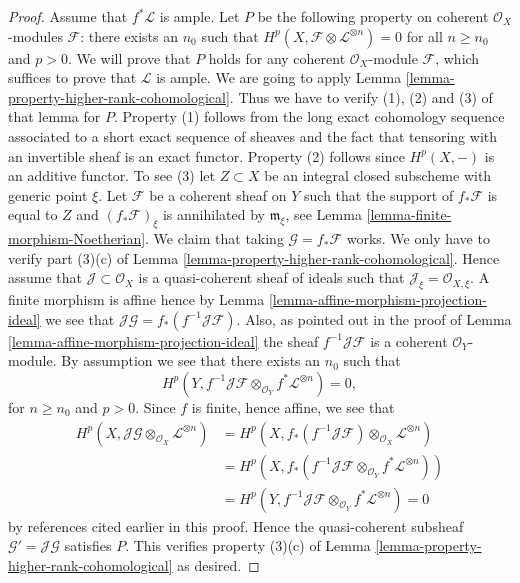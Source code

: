 \begin{proof}
\medskip\noindent
Assume that $f^*\mathcal{L}$ is ample. Let $P$ be the following property on
coherent $\mathcal{O}_X$-modules $\mathcal{F}$: there exists an $n_0$
such that $H^p(X, \mathcal{F} \otimes \mathcal{L}^{\otimes n}) = 0$
for all $n \geq n_0$ and $p > 0$. We will prove that $P$ holds
for any coherent $\mathcal{O}_X$-module $\mathcal{F}$, which suffices
to prove that $\mathcal{L}$ is ample.
We are going to apply Lemma \ref{lemma-property-higher-rank-cohomological}.
Thus we have to verify (1), (2) and (3) of that lemma for $P$.
Property (1) follows from the long exact cohomology sequence associated
to a short exact sequence of sheaves and the fact that tensoring with
an invertible sheaf is an exact functor. Property (2) follows since
$H^p(X, -)$ is an additive functor. To see (3) let $Z \subset X$ be
an integral closed subscheme with generic point $\xi$.
Let $\mathcal{F}$ be a coherent sheaf on $Y$ such that
the support of $f_*\mathcal{F}$ is equal to $Z$
and $(f_*\mathcal{F})_\xi$ is annihilated by $\mathfrak m_\xi$,
see Lemma \ref{lemma-finite-morphism-Noetherian}. We claim that
taking $\mathcal{G} = f_*\mathcal{F}$ works. We only have to verify
part (3)(c) of Lemma \ref{lemma-property-higher-rank-cohomological}.
Hence assume that $\mathcal{J} \subset \mathcal{O}_X$ is a
quasi-coherent sheaf of ideals such that
$\mathcal{J}_\xi = \mathcal{O}_{X, \xi}$.
A finite morphism is affine hence by
Lemma \ref{lemma-affine-morphism-projection-ideal} we see that
$\mathcal{J}\mathcal{G} = f_*(f^{-1}\mathcal{J}\mathcal{F})$.
Also, as pointed out in the proof of
Lemma \ref{lemma-affine-morphism-projection-ideal} the sheaf
$f^{-1}\mathcal{J}\mathcal{F}$ is a coherent $\mathcal{O}_Y$-module.
By assumption we see that there exists an $n_0$ such that
$$
H^p(Y, f^{-1}\mathcal{J}\mathcal{F}
\otimes_{\mathcal{O}_Y} f^*\mathcal{L}^{\otimes n}) = 0,
$$
for $n \geq n_0$ and $p > 0$. Since $f$ is finite, hence affine, we see that
\begin{align*}
H^p(X, \mathcal{J}\mathcal{G} \otimes_{\mathcal{O}_X}
\mathcal{L}^{\otimes n})
& =
H^p(X, f_*(f^{-1}\mathcal{J}\mathcal{F}) \otimes_{\mathcal{O}_X}
\mathcal{L}^{\otimes n}) \\
& =
H^p(X, f_*(f^{-1}\mathcal{J}\mathcal{F} \otimes_{\mathcal{O}_Y}
f^*\mathcal{L}^{\otimes n})) \\
& =
H^p(Y, f^{-1}\mathcal{J}\mathcal{F} \otimes_{\mathcal{O}_Y}
f^*\mathcal{L}^{\otimes n}) = 0
\end{align*}
by references cited earlier in this proof.
Hence the quasi-coherent subsheaf $\mathcal{G}' = \mathcal{J}\mathcal{G}$
satisfies $P$. This verifies property (3)(c) of
Lemma \ref{lemma-property-higher-rank-cohomological} as desired.
\end{proof}

